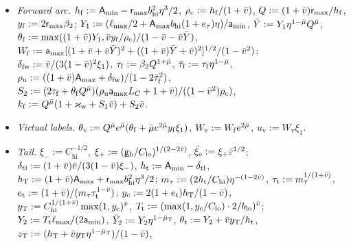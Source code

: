 \begin{definition}
{\begin{itemize}
$C_{\mathrm{hi}}:=2\sr_{\max}\beta_2^{1-\vbar}$, $C_{\mathrm{lo}}:=2\sr_{\min}(b_{\mathrm{lo}}/2)/(1+\tan^2(\bar b/2))$;
$\mathrm{aux}:=\ell_{\max}\bar b\eta/2$, $\sa_{\min}:=\sA_{\min}\cos\bar b-\mathrm{aux}$, $\sa_{\max}:=\sA_{\max}(1+\vbar)+\mathrm{aux}$;
$L_C:=2\Lambda_{\max}/\Lambda_{\min}+\eta\sA_{\max}/\sr_{\min}$,
$L_{\mathrm{lo}}:=2(\cos\bar b-\vbar)(\Lambda_{\min}/\Lambda_{\max})(1-\eta^2/32)$;
$S_1:=\ell_{\max}(\sr_{\max}\sa_{\max}L_C+(1+\vbar)\eta)/(2(1-\vbar^2)\sr_{\min})$.
\item \emph{Forward arc.} $h_{\mathrm f}:=\mathsf A_{\min}-\mathsf r_{\max}b_{\mathrm{hi}}^2\eta^3/2$, $\rho_{\mathrm c}:=h_{\mathrm f}/(1+\bar v)$,
$Q:=(1+\bar v)\mathsf r_{\max}/h_{\mathrm f}$, $y_{\mathrm f}:=2\mathsf r_{\max}\beta_2$;
$Y_1:=(\ell_{\max}/2+\mathsf A_{\max}b_{\mathrm{hi}}(1+e_\tau)\eta)/\mathsf a_{\min}$, $\bar Y:=Y_1\eta^{1-\bar\mu}Q^{\bar\mu}$,
$\theta_{\mathrm f}:=\max((1+\bar v)Y_1,\bar v y_{\mathrm f}/\rho_{\mathrm c})/(1-\bar v-\bar v\bar Y)$,
$W_{\mathrm f}:=\mathsf a_{\max}[(1+\bar v+\bar v\bar Y)^2+((1+\bar v)\bar Y+\bar v)^2]^{1/2}/(1-\bar v^2)$;
$\delta_{\mathrm{fw}}:=\bar v/(3(1-\bar v)^2\xi_1)$, $\tau_{\mathrm f}:=\beta_2Q^{1+\bar\mu}$, $\bar\tau_{\mathrm f}:=\tau_{\mathrm f}\eta^{1-\bar\mu}$,
$\rho_{\mathrm u}:=((1+\bar v)\mathsf A_{\max}+\delta_{\mathrm{fw}})/(1-2\bar\tau_{\mathrm f}^2)$,
$S_2:=(2\tau_{\mathrm f}+\theta_{\mathrm f}Q^{\bar\mu})(\rho_{\mathrm u}\mathsf a_{\max}L_C+1+\bar v)/((1-\bar v^2)\rho_{\mathrm c})$,
$k_{\mathrm f}:=Q^{\bar\mu}(1+\varkappa_{\mathrm w}+S_1\bar v)+S_2\bar v$.
\item \emph{Virtual labels.} $\theta_{\mathrm v}:=Q^{\bar\mu}e^{\bar\mu}(\theta_{\mathrm f}+\bar\mu e^{2\bar\mu}y_{\mathrm f}\xi_1)$,
$W_{\mathrm v}:=W_{\mathrm f}e^{2\bar\mu}$, $u_{\mathrm v}:=W_{\mathrm v}\xi_1$.
\item \emph{Tail.} $\xi_-:=C_{\mathrm{hi}}^{-1/2}$, $\xi_+:=(\mathsf g_{\mathrm b}/C_{\mathrm{lo}})^{1/(2-2\bar v)}$, $\bar\xi_{\mathrm e}:=\xi_+\bar\varepsilon^{1/2}$;
$\delta_{\mathrm{tl}}:=(1+\bar v)\bar v/(3(1-\bar v)\xi_-)$, $h_{\mathrm t}:=\mathsf A_{\min}-\delta_{\mathrm{tl}}$,
$h_{\mathrm T}:=(1+\bar v)\mathsf A_{\max}+\mathsf r_{\max}b_{\mathrm{hi}}^2\eta^3/2$; $m_\tau:=(2h_{\mathrm t}/C_{\mathrm{hi}})\eta^{-(1-2\bar v)}$,
$\tau_{\mathrm t}:=m_\tau^{1/(1+\bar v)}$, $e_{\mathrm t}:=(1+\bar v)/(m_\tau\tau_{\mathrm t}^{1-\bar v})$;
$y_{\mathrm c}:=2(1+e_{\mathrm t})h_{\mathrm T}/(1-\bar v)$, $y_{\mathrm T}:=C_{\mathrm{hi}}^{1/(1+\bar v)}\max(1,y_{\mathrm c})^{\bar v}$,
$T_{\mathrm t}:=(\max(1,y_{\mathrm c}/C_{\mathrm{lo}})\cdot2/b_{\mathrm{lo}})^{\bar v}$;
$Y_2:=T_{\mathrm t}\ell_{\max}/(2\mathsf a_{\min})$, $\bar Y_2:=Y_2\eta^{1-\bar\mu_{\mathrm T}}$,
$\theta_{\mathrm t}:=Y_2+\bar v y_{\mathrm T}/h_{\mathrm t}$, $z_{\mathrm T}:=(h_{\mathrm T}+\bar v y_{\mathrm T}\eta^{1-\bar\mu_{\mathrm T}})/(1-\bar v)$,

\end{itemize}}
\end{definition}
